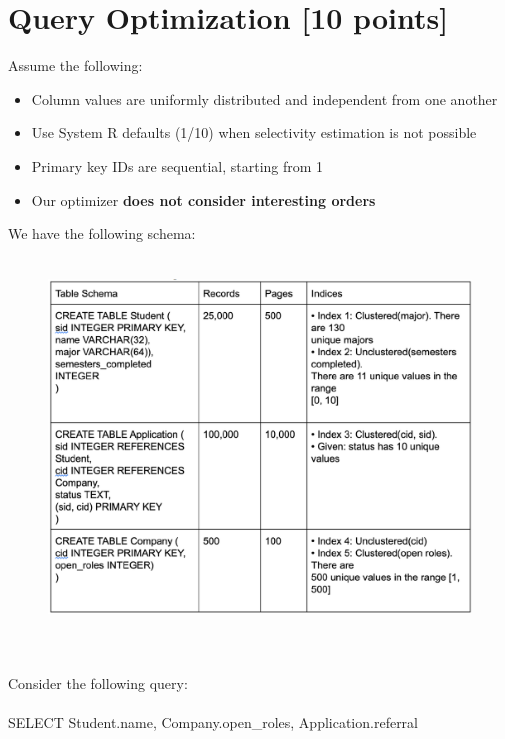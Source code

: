 \documentclass[10pt]{article}
\begin{document}
\newpage

\section{Query Optimization  \textbf{[10 points]}}
Assume the following:
\begin{itemize}
    \item Column values are uniformly distributed and independent from one another
    \item Use System R defaults (1/10) when selectivity estimation is not possible
    \item Primary key IDs are sequential, starting from 1
    \item Our optimizer \textbf{does not consider interesting orders}
\end{itemize}
We have the following schema:
\begin{figure}[h]\centering\includegraphics[height=10cm]{query_opt.png}\end{figure}\\
Consider the following query:\\ \\
SELECT Student.name, Company.open\_roles, Application.referral\\
\end{document}
